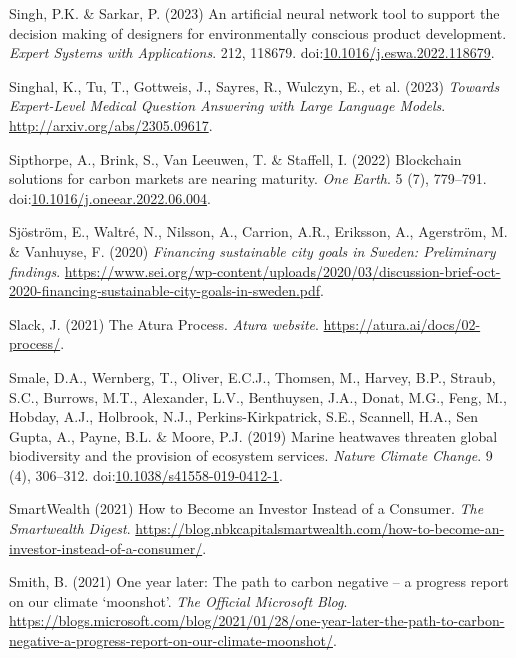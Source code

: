 \documentclass[
  letterpaper,
  DIV=11,
  numbers=noendperiod]{scrartcl}
\newlength{\cslhangindent}
\newenvironment{CSLReferences}[2] %
 {\begin{list}{}{%
  \setlength{\itemindent}{0pt}
  \setlength{\leftmargin}{0pt}
  \setlength{\parsep}{0pt}
  \ifodd #1
   \setlength{\leftmargin}{\cslhangindent}
   \setlength{\itemindent}{-1\cslhangindent}
  \fi
  \setlength{\itemsep}{#2\baselineskip}}}
 {\end{list}}
\begin{document}
\begin{CSLReferences}{0}{1}
Singh, P.K. \& Sarkar, P. (2023) An artificial neural network tool to
support the decision making of designers for environmentally conscious
product development. \emph{Expert Systems with Applications}. 212,
118679.
doi:\href{https://doi.org/10.1016/j.eswa.2022.118679}{10.1016/j.eswa.2022.118679}.

Singhal, K., Tu, T., Gottweis, J., Sayres, R., Wulczyn, E., et al.
(2023) \emph{Towards {Expert-Level Medical Question Answering} with
{Large Language Models}}. \url{http://arxiv.org/abs/2305.09617}.

Sipthorpe, A., Brink, S., Van Leeuwen, T. \& Staffell, I. (2022)
Blockchain solutions for carbon markets are nearing maturity. \emph{One
Earth}. 5 (7), 779--791.
doi:\href{https://doi.org/10.1016/j.oneear.2022.06.004}{10.1016/j.oneear.2022.06.004}.

Sjöström, E., Waltré, N., Nilsson, A., Carrion, A.R., Eriksson, A.,
Agerström, M. \& Vanhuyse, F. (2020) \emph{Financing sustainable city
goals in {Sweden}: Preliminary findings}.
\url{https://www.sei.org/wp-content/uploads/2020/03/discussion-brief-oct-2020-financing-sustainable-city-goals-in-sweden.pdf}.

Slack, J. (2021) The {Atura Process}. \emph{Atura website}.
\url{https://atura.ai/docs/02-process/}.

Smale, D.A., Wernberg, T., Oliver, E.C.J., Thomsen, M., Harvey, B.P.,
Straub, S.C., Burrows, M.T., Alexander, L.V., Benthuysen, J.A., Donat,
M.G., Feng, M., Hobday, A.J., Holbrook, N.J., Perkins-Kirkpatrick, S.E.,
Scannell, H.A., Sen Gupta, A., Payne, B.L. \& Moore, P.J. (2019) Marine
heatwaves threaten global biodiversity and the provision of ecosystem
services. \emph{Nature Climate Change}. 9 (4), 306--312.
doi:\href{https://doi.org/10.1038/s41558-019-0412-1}{10.1038/s41558-019-0412-1}.

SmartWealth (2021) How to {Become} an {Investor Instead} of a
{Consumer}. \emph{The Smartwealth Digest}.
\url{https://blog.nbkcapitalsmartwealth.com/how-to-become-an-investor-instead-of-a-consumer/}.

Smith, B. (2021) One year later: {The} path to carbon negative -- a
progress report on our climate {`moonshot'}. \emph{The Official
Microsoft Blog}.
\url{https://blogs.microsoft.com/blog/2021/01/28/one-year-later-the-path-to-carbon-negative-a-progress-report-on-our-climate-moonshot/}.


\end{CSLReferences}
\end{document}
